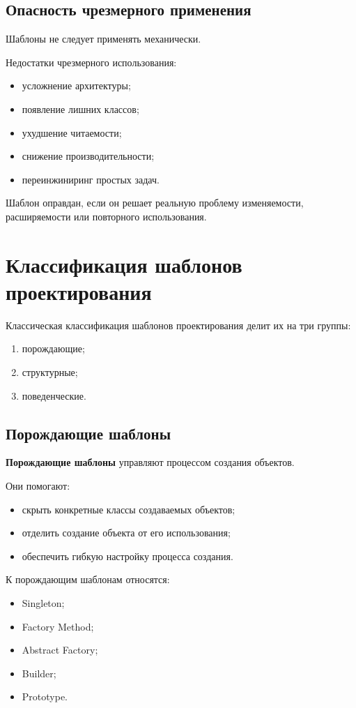 \documentclass[12pt,a4paper]{article}
\begin{document}
\subsection{Опасность чрезмерного применения}

Шаблоны не следует применять механически.

Недостатки чрезмерного использования:
\begin{itemize}
    \item усложнение архитектуры;
    \item появление лишних классов;
    \item ухудшение читаемости;
    \item снижение производительности;
    \item переинжиниринг простых задач.
\end{itemize}

Шаблон оправдан, если он решает реальную проблему изменяемости, расширяемости или повторного использования.

\section{Классификация шаблонов проектирования}

Классическая классификация шаблонов проектирования делит их на три группы:
\begin{enumerate}
    \item порождающие;
    \item структурные;
    \item поведенческие.
\end{enumerate}

\subsection{Порождающие шаблоны}

\textbf{Порождающие шаблоны} управляют процессом создания объектов.

Они помогают:
\begin{itemize}
    \item скрыть конкретные классы создаваемых объектов;
    \item отделить создание объекта от его использования;
    \item обеспечить гибкую настройку процесса создания.
\end{itemize}

К порождающим шаблонам относятся:
\begin{itemize}
    \item Singleton;
    \item Factory Method;
    \item Abstract Factory;
    \item Builder;
    \item Prototype.
\end{itemize}
\end{document}
